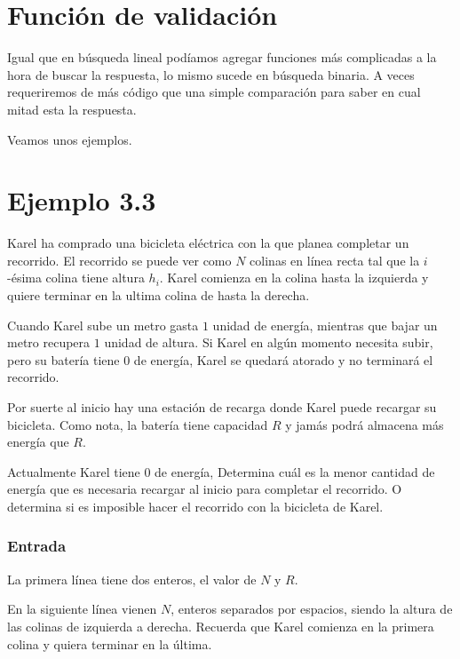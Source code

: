 \codeforces



\newpage
\section*{Función de validación}
Igual que en búsqueda lineal podíamos agregar funciones más complicadas a la hora de buscar la respuesta, lo mismo sucede en búsqueda binaria. A veces requeriremos de más código que una simple comparación para saber en cual mitad esta la respuesta.

Veamos unos ejemplos.


\section*{Ejemplo 3.3}
Karel ha comprado una bicicleta eléctrica con la que planea completar un recorrido. El recorrido se puede ver como \(N\) colinas en línea recta tal que la \(i\)-ésima colina tiene altura \(h_i\). Karel comienza en la colina hasta la izquierda y quiere terminar en la ultima colina de hasta la derecha.

Cuando Karel sube un metro gasta \(1\) unidad de energía, mientras que bajar un metro recupera \(1\) unidad de altura. Si Karel en algún momento necesita subir, pero su batería tiene 0 de energía, Karel se quedará atorado y no terminará el recorrido.

Por suerte al inicio hay una estación de recarga donde Karel puede recargar su bicicleta. Como nota, la batería tiene capacidad \(R\) y jamás podrá almacena más energía que \(R\).

Actualmente Karel tiene \(0\) de energía, Determina cuál es la menor cantidad de energía que es necesaria recargar al inicio para completar el recorrido. O determina si es imposible hacer el recorrido con la bicicleta de Karel.

\subsubsection*{Entrada}
La primera línea tiene dos enteros, el valor de \(N\) y \(R\).

En la siguiente línea vienen \(N\), enteros separados por espacios, siendo la altura de las colinas de izquierda a derecha. Recuerda que Karel comienza en la primera colina y quiera terminar en la última.
